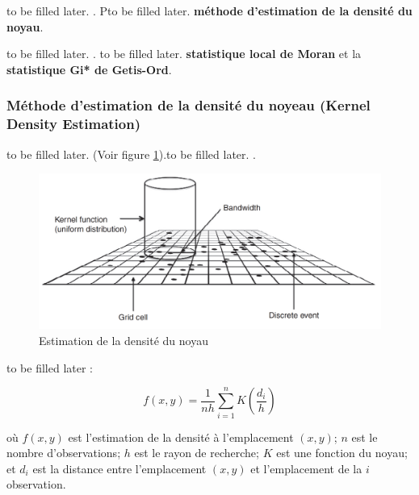 \medskip
to be filled later. \parencite{chang_introduction_2019}. Pto be filled later. \textbf{méthode d'estimation de la densité du noyau}.

\medskip
to be filled later. \parencite{chang_introduction_2019}. to be filled later. \textbf{statistique local de Moran} et la \textbf{statistique Gi* de Getis-Ord}.

\medskip

\subsubsection{Méthode d'estimation de la densité du noyeau (Kernel Density Estimation)}to be filled later. \parencite{hart_kernel_2014} (Voir figure \ref{fig:kde}).to be filled later. \parencite{gatrell_spatial_1996}. 

\begin{figure}[hbt!]
  \centering
  \includegraphics[width=14cm]{images_pfe/kernel_density_estimation.png}
  \caption{Estimation de la densité du noyau \parencite{hart_kernel_2014}}
  \label{fig:kde}
\end{figure}
\FloatBarrier

\medskip

\medskip
to be filled later \parencite{fotheringham_quantitative_2007} :

\medskip

\begin{equation}
   \displaystyle f(x,y) = \frac{1}{nh} \sum_{i=1}^{n} K (\frac{d_i}{h})
   \label{kernel-density-estimation}
\end{equation}

\medskip

où $f(x, y)$ est l'estimation de la densité à l'emplacement $(x, y)$; $n$ est le nombre d'observations; $h$ est le rayon de recherche; $K$ est une fonction du noyau; et $d_i$ est la distance entre l'emplacement $(x, y)$ et l'emplacement de la $i$ observation.




